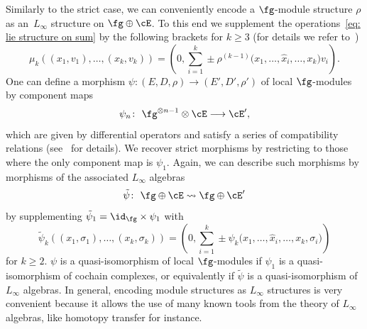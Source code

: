 Similarly to the strict case, we can conveniently encode a $\fg$-module structure $\rho$ as an~$L_\infty$ structure on $\fg \oplus \cE$. To this end we supplement the operations~\eqref{eq: lie structure on sum} by the following brackets for $k\geq3$ (for details we refer to~\cite{Allocca, Lada})
\begin{equation*}
\mu_k((x_1,v_1),\dots,(x_k,v_k)) = \left( 0 , \sum_{i=1}^{k} \pm \rho^{(k-1)}\big(x_1,\dots,\hat{x}_i,\dots,x_k\big)v_i \right).
\end{equation*}
One can define a morphism $\psi \colon (E,D,\rho) \longrightarrow (E',D',\rho')$ of local $\fg$-modules by component maps
\begin{equation*}
\psi_n \colon \ \fg^{\otimes n-1} \otimes \cE \longrightarrow \cE' ,
\end{equation*}
which are given by differential operators and satisfy a series of compatibility relations (see~\cite{Allocca} for details). We recover strict morphisms by restricting to those where the only component map is $\psi_1$. Again, we can describe such morphisms by morphisms of the associated $L_\infty$ algebras
\begin{equation*}
\tilde{\psi} \colon \ \fg \oplus \cE \rightsquigarrow \fg \oplus \cE'
\end{equation*}
by supplementing $\tilde{\psi}_1 = \id_{\fg} \times \psi_1$ with
\begin{equation*}
\tilde{\psi}_k ((x_1,\sigma_1) , \dots , (x_k, \sigma_k)) = \left(0, \sum_{i=1}^{k} \pm \psi_k\big(x_1, \dots , \hat{x}_i , \dots , x_k , \sigma_i \big)\right)
\end{equation*}
for $k \geq 2$. $\psi$ is a quasi-isomorphism of local $\fg$-modules if $\psi_1$ is a quasi-isomorphism of cochain complexes, or equivalently if $\tilde{\psi}$ is a quasi-isomorphism of $L_\infty$ algebras. In general, encoding module structures as $L_\infty$ structures is very convenient because it allows the use of many known tools from the theory of $L_\infty$ algebras, like homotopy transfer for instance.

